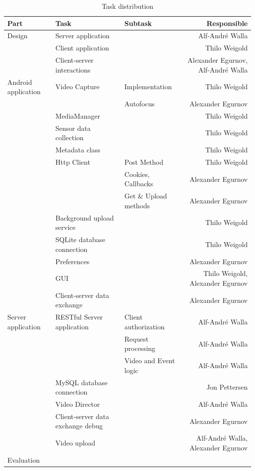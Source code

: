 \documentclass[conference]{IEEEtran}
\begin{document}

\begin{table}[t]
	\centering
	\renewcommand{\arraystretch}{1.5}
	\caption{Task distribution}
	\label{tab:task_distr}
	\begin{tabular}{lllr}
		\toprule
		Part & Task & Subtask & Responsible \\
		\midrule
		Design
			& Server application & & Alf-André Walla \\
			& Client application & & Thilo Weigold \\
			& Client-server interactions & & Alexander Egurnov, Alf-André Walla \\
		\midrule
		Android application
			& Video Capture & Implementation & Thilo Weigold \\
			&       & Autofocus & Alexander Egurnov \\
			& MediaManager & & Thilo Weigold \\
			& Sensor data collection & & Thilo Weigold \\
			& Metadata class & & Thilo Weigold \\
			& Http Client & Post Method & Thilo Weigold \\
			&       & Cookies, Callbacks & Alexander Egurnov \\
			&       & Get \& Upload methods & Alexander Egurnov \\
			& Background upload service & & Thilo Weigold \\
			& SQLite database connection & & Thilo Weigold \\
			& Preferences & & Alexander Egurnov \\
			& GUI & & Thilo Weigold, Alexander Egurnov \\
			& Client-server data exchange & & Alexander Egurnov \\
		\midrule
		Server application 
			& RESTful Server application & Client authorization & Alf-André Walla \\
			&       & Request processing & Alf-André Walla \\
			&       & Video and Event logic & Alf-André Walla \\
			& MySQL database connection & & Jon Pettersen \\
			& Video Director & & Alf-André Walla \\
			& Client-server data exchange debug & & Alexander Egurnov \\
			& Video upload & & Alf-André Walla, Alexander Egurnov \\
		\midrule
		Evaluation

\end{tabular}
\end{table}
\end{document}

